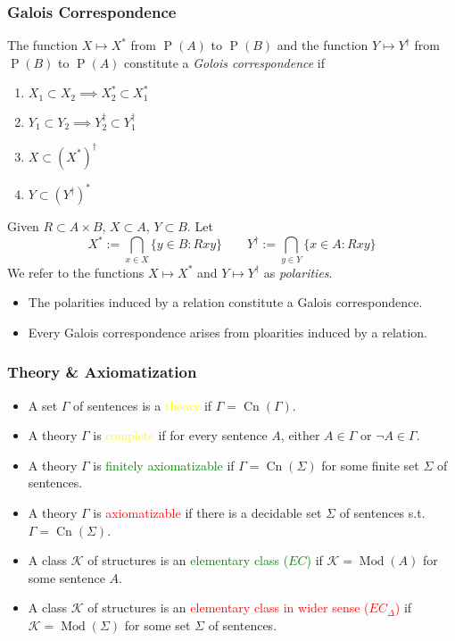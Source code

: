 \documentclass[UTF8,aspectratio=43,11pt,colorlinks,compress,openany]{beamer}%
\begin{document}
\begin{frame}\frametitle{Galois Correspondence}
\setlength\abovedisplayskip{0pt}
\setlength\belowdisplayskip{0pt}
\begin{definition}
The function $X\mapsto X^*$ from $\operatorname{P}(A)$ to $\operatorname{P}(B)$ and the function $Y\mapsto Y^\dagger$ from $\operatorname{P}(B)$ to $\operatorname{P}(A)$ constitute a \emph{Golois correspondence} if
\begin{enumerate}
	\item $X_1\subset X_2\implies X_2^*\subset X_1^*$
	\item $Y_1\subset Y_2\implies Y_2^\dagger\subset Y_1^\dagger$
	\item $X\subset(X^*)^\dagger$
	\item $Y\subset(Y^\dagger)^*$
\end{enumerate}
\end{definition}
\begin{definition}[Polarity]
Given $R\subset A\times B$, $X\subset A$, $Y\subset B$. Let
\[X^*:=\bigcap_{x\in X}\{y\in B: Rxy\}\qquad Y^\dagger:=\bigcap_{y\in Y}\{x\in A: Rxy\}\]
We refer to the functions $X\mapsto X^*$ and $Y\mapsto Y^\dagger$ as \emph{polarities}.
\end{definition}
\begin{itemize}\small
	\item The polarities induced by a relation constitute a Galois correspondence.
	\item Every Galois correspondence arises from ploarities induced by a relation.
\end{itemize}
\end{frame}

\begin{frame}\frametitle{Theory \& Axiomatization}
	\begin{itemize}
		\item A set $\Gamma$ of sentences is a \textcolor{yellow}{theory} if $\Gamma=\operatorname{Cn}(\Gamma)$.
		\item A theory $\Gamma$ is \textcolor{yellow}{complete} if for every sentence $A$, either $A\in\Gamma$ or $\neg A\in\Gamma$.
		\item A theory $\Gamma$ is \textcolor{green}{finitely axiomatizable} if $\Gamma=\operatorname{Cn}(\Sigma)$ for some finite set $\Sigma$ of sentences.
		\item A theory $\Gamma$ is \textcolor{red}{axiomatizable} if there is a decidable set $\Sigma$ of sentences s.t. $\Gamma=\operatorname{Cn}(\Sigma)$.
		\item A class $\mathcal{K}$ of structures is an \textcolor{green}{elementary class ($EC$)} if $\mathcal{K}=\operatorname{Mod}(A)$ for some sentence $A$.
		\item A class $\mathcal{K}$ of structures is an \textcolor{red}{elementary class in wider sense ($EC_\Delta$)} if $\mathcal{K}=\operatorname{Mod}(\Sigma)$ for some set $\Sigma$ of sentences.
	\end{itemize}
\end{frame}
\end{document}
